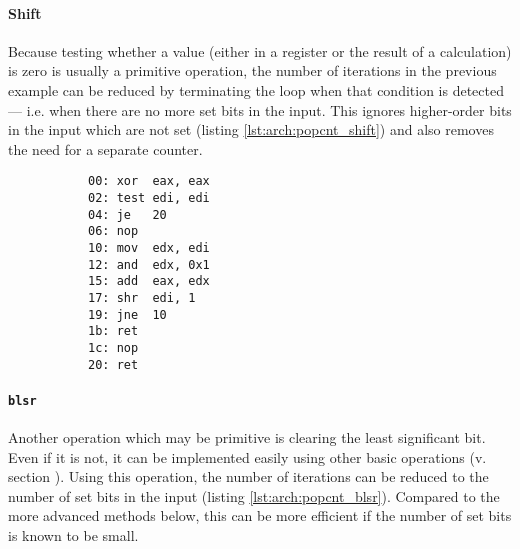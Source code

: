 \paragraph{Shift}

Because testing whether a value (either in a register or the result of a
calculation) is zero is usually a primitive operation, the number of iterations
in the previous example can be reduced by terminating the loop when that
condition is detected --- i.e.  when there are no more set bits in the input.
This ignores higher-order bits in the input which are not set (listing
\ref{lst:arch:popcnt_shift}) and also removes the need for a separate counter.

\begin{figure}[ht]
    \vspace{-\baselineskip}
    \begin{subfigure}[t]{0.65\textwidth}
        
    \end{subfigure}
    \hspace*{\fill}
    \begin{subfigure}[t]{0.3\textwidth}
        \begin{lstlisting}[style=x86]
00: xor  eax, eax
02: test edi, edi
04: je   20
06: nop
10: mov  edx, edi
12: and  edx, 0x1
15: add  eax, edx
17: shr  edi, 1
19: jne  10
1b: ret
1c: nop
20: ret
        \end{lstlisting}
    \end{subfigure}
    \vspace{-2\baselineskip}
\end{figure}

\paragraph{\texttt{blsr}}

Another operation which may be primitive is clearing the least significant bit.
Even if it is not, it can be implemented easily using other basic operations (v.
section ).  Using this operation, the number of
iterations can be reduced to the number of set bits in the input (listing
\ref{lst:arch:popcnt_blsr}).  Compared to the more advanced methods below, this
can be more efficient if the number of set bits is known to be
small\footnotemark.

